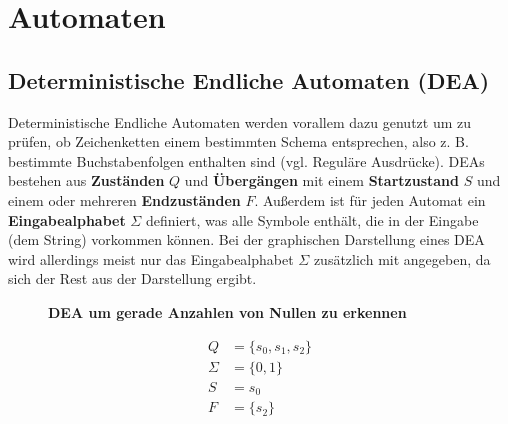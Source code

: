 \section{Automaten}

\subsection{Deterministische Endliche Automaten (DEA)}

Deterministische Endliche Automaten werden vorallem dazu genutzt um zu prüfen,
ob Zeichenketten einem bestimmten Schema entsprechen, also z. B. bestimmte Buchstabenfolgen
enthalten sind (vgl. Reguläre Ausdrücke).
DEAs bestehen aus \textbf{Zuständen} $Q$ und \textbf{Übergängen} mit einem
\textbf{Startzustand} $S$ und einem oder
mehreren \textbf{Endzuständen} $F$. Außerdem ist für jeden Automat
ein \textbf{Eingabealphabet} $\Sigma$ definiert, was alle Symbole enthält,
die in der Eingabe (dem String) vorkommen können.
Bei der graphischen Darstellung eines DEA wird allerdings meist nur das Eingabealphabet
$\Sigma$ zusätzlich mit angegeben, da sich der Rest aus der Darstellung ergibt.

\vspace*{0.5cm}

\begin{figure}[h]
    \centering
    \caption*{\textbf{DEA um gerade Anzahlen von Nullen zu erkennen}}
\end{figure}

\vspace*{-2cm}

\Large
\begin{align*}
    Q & = \{s_0, s_1, s_2\} \\
    \Sigma & = \{0, 1\} \\
    S & = s_0 \\
    F & = \{s_2\}
\end{align*}
\normalsize

